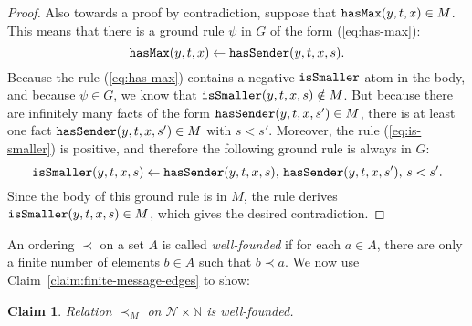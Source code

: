 \documentclass{tlp}
\newtheorem{claim}[theorem]{Claim}
\newcommand{\Nat}{\mathbb{N}}  \newcommand{\len}[1]{|#1|} \newcommand{\rom}[1]{\text{\emph{(#1)}}} \newcommand{\romI}{\rom i}
\newcommand{\grl}{\psi}
\newcommand{\nw}{\mathcal{N}}
\newcommand{\issmaller}{\pred{isSmaller}}
\newcommand{\hasmax}{\pred{hasMax}}
\newcommand{\hassender}{\pred{hasSender}}
\newcommand{\nwnat}{\nw\times\Nat}
\newcommand{\grded}{G}
\newcommand{\cauM}{\prec_{M}}
\begin{document}
\begin{proof}
Also towards a proof by contradiction, suppose that $\hasmax(y,t,x)\in M$.
This means that there is a ground rule $\grl$ in $\grded$ of the
form (\ref{eq:has-max}):
\[
\hasmax(y,t,x)\gets\hassender(y,t,x,s).
\]
Because the rule (\ref{eq:has-max}) contains a negative $\issmaller$-atom
in the body, and because $\grl\in\grded$, we know that $\issmaller(y,t,x,s)\notin M$.
But because there are infinitely many facts of the form $\hassender(y,t,x,s')\in M$,
there is at least one fact $\hassender(y,t,x,s')\in M$ with $s<s'$.
Moreover, the rule (\ref{eq:is-smaller}) is positive, and therefore
the following ground rule is always in $\grded$:
\[
\issmaller(y,t,x,s)\gets\hassender(y,t,x,s),\,\hassender(y,t,x,s'),\, s<s'.
\]
Since the body of this ground rule is in $M$, the rule derives $\issmaller(y,t,x,s)\in M$,
which gives the desired contradiction. \end{proof} 



An ordering $\prec$ on a set $A$ is called \emph{well-founded}
if for each $a\in A$, there are only a finite number of elements
$b\in A$ such that $b\prec a$. We now use Claim~\ref{claim:finite-message-edges}
to show:

\begin{claim}Relation $\cauM$ on $\nwnat$ is well-founded.\end{claim}
\end{document}
